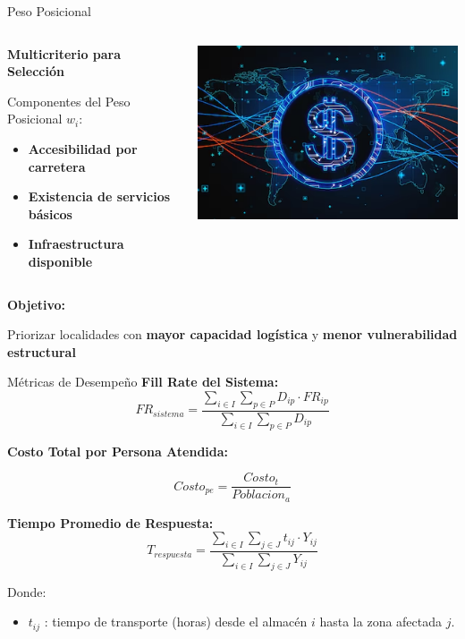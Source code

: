 \documentclass[
  ignorenonframetext,
]{beamer}
\providecommand{\tightlist}{%
  \setlength{\itemsep}{0pt}\setlength{\parskip}{0pt}}
\begin{document}
\begin{frame}{Peso Posicional}
\label{peso-posicional}
\begin{columns}[T]
\begin{column}{0.5\linewidth}
\textbf{Multicriterio para Selección}

Componentes del Peso Posicional \(w_i\):

\begin{itemize}
\tightlist
\item
  \textbf{Accesibilidad por carretera}
\item
  \textbf{Existencia de servicios básicos}
\item
  \textbf{Infraestructura disponible}
\end{itemize}
\end{column}

\begin{column}{0.5\linewidth}
\includegraphics[width=0.85\linewidth,height=\textheight,keepaspectratio]{peso.png}
\end{column}
\end{columns}

\textbf{Objetivo:}

Priorizar localidades con \textbf{mayor capacidad logística} y
\textbf{menor vulnerabilidad estructural}
\end{frame}

\begin{frame}{Métricas de Desempeño}
\label{muxe9tricas-de-desempeuxf1o}
\textbf{Fill Rate del Sistema:}
\[FR_{sistema} = \frac{\sum_{i \in I} \sum_{p \in P} D_{ip} \cdot FR_{ip}}{\sum_{i \in I} \sum_{p \in P} D_{ip}}\]

\textbf{Costo Total por Persona Atendida:}

\[Costo_{pe} = \frac{Costo_{t}}{Poblacion_{a}}\]

\textbf{Tiempo Promedio de Respuesta:}
\[T_{respuesta} = \frac{\sum_{i \in I} \sum_{j \in J} t_{ij} \cdot Y_{ij}}{\sum_{i \in I} \sum_{j \in J} Y_{ij}}\]

Donde:

\begin{itemize}
\tightlist
\item
  \(t_{ij}\) : tiempo de transporte (horas) desde el almacén \(𝑖\) hasta
  la zona afectada \(𝑗\).
\end{itemize}
\end{frame}
\end{document}
